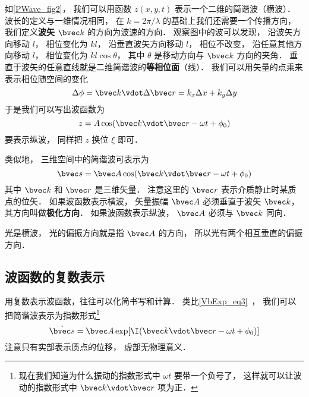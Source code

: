 如\autoref{PWave_fig2}， 我们可以用函数 $z(x,y,t)$ 表示一个二维的简谐波（横波）． 波长的定义与一维情况相同， 在 $k = 2\pi/\lambda$ 的基础上我们还需要一个传播方向， 我们定义\textbf{波矢} $\bvec k$ 的方向为波速的方向．
观察图中的波可以发现， 沿波矢方向移动 $l$， 相位变化为 $kl$， 沿垂直波矢方向移动 $l$， 相位不改变， 沿任意其他方向移动 $l$， 相位变化为 $kl\cos\theta$， 其中 $\theta$ 是移动方向与 $\bvec k$ 方向的夹角． 垂直于波矢的任意直线就是二维简谐波的\textbf{等相位面}（线）． 我们可以用矢量的点乘来表示相位随空间的变化
\begin{equation}
\Delta\phi = \bvec k \vdot \Delta\bvec r = k_x \Delta x + k_y \Delta y
\end{equation}
于是我们可以写出波函数为
\begin{equation}\label{PWave_eq8}
z = A \cos(\bvec k \vdot \bvec r - \omega t + \phi_0)
\end{equation}
要表示纵波， 同样把 $z$ 换位 $\xi$ 即可．

类似地， 三维空间中的简谐波可表示为
\begin{equation}
\bvec s = \bvec A \cos(\bvec k \vdot \bvec r - \omega t + \phi_0)
\end{equation}
其中 $\bvec k$ 和 $\bvec r$ 是三维矢量． 注意这里的 $\bvec r$ 表示介质静止时某质点的位矢． 如果波函数表示横波， 矢量振幅 $\bvec A$ 必须垂直于波矢 $\bvec k$， 其方向叫做\textbf{极化方向}． 如果波函数表示纵波， $\bvec A$ 必须与 $\bvec k$ 同向．

光是横波， 光的偏振方向就是指 $\bvec A$ 的方向， 所以光有两个相互垂直的偏振方向．

\subsection{波函数的复数表示}

用复数表示波函数，往往可以化简书写和计算． 类比\autoref{VbExp_eq3}~， 我们可以把简谐波表示为指数形式\footnote{现在我们知道为什么振动的指数形式中 $\omega t$ 要带一个负号了， 这样就可以让波动的指数形式中 $\bvec k\vdot \bvec r$ 项为正．}
\begin{equation}
\tilde {\bvec s} = \bvec A \exp[\I( \bvec k \vdot \bvec r - \omega t + \phi_0)]
\end{equation}
注意只有实部表示质点的位移， 虚部无物理意义．

